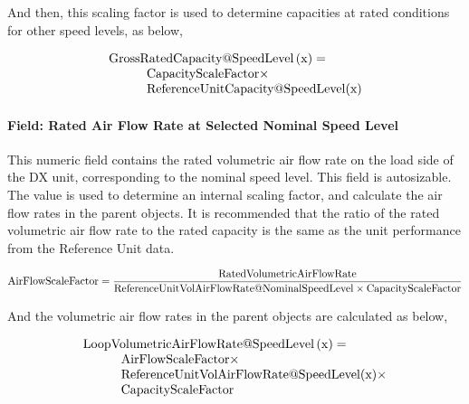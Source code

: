 And then, this scaling factor is used to determine capacities at rated conditions for other speed levels, as below,

\begin{equation}
  \begin{array}{l}
    \rm{Gross RatedCapacity} @ \rm{SpeedLevel} \left( {\rm{x}} \right) = \\
    \quad \quad \quad \rm{CapacityScaleFactor} \times \\
    \quad \quad \quad \rm{ReferenceUnitCapacity} @ {\rm{SpeedLevel}}(\rm{x})
  \end{array}
\end{equation}

\paragraph{Field: Rated Air Flow Rate at Selected Nominal Speed Level}\label{field-rated-air-flow-rate-at-selected-nominal-speed-level}

This numeric field contains the rated volumetric air flow rate on the load side of the DX unit, corresponding to the nominal speed level. This field is autosizable. The value is used to determine an internal scaling factor, and calculate the air flow rates in the parent objects. It is recommended that the ratio of the rated volumetric air flow rate to the rated capacity is the same as the unit performance from the Reference Unit data.

\begin{equation}
\rm{AirFlowScaleFactor} = \frac{\rm{RatedVolumetricAirFlowRate}}{\rm{ReferenceUnitVolAirFlowRate} @ \rm{NominalSpeedLevel} \times \rm{CapacityScaleFactor}}
\end{equation}

And the volumetric air flow rates in the parent objects are calculated as below,

\begin{equation}
  \begin{array}{l}
    \rm{LoopVolumetricAirFlowRate} @ \rm{SpeedLevel} \left( \rm{x} \right) = \\
    \quad \quad \quad \rm{AirFlowScaleFactor} \times \\
    \quad \quad \quad \rm{ReferenceUnitVolAirFlowRate} @ \rm{SpeedLevel}(\rm{x}) \times \\
    \quad \quad \quad \rm{CapacityScaleFactor}
  \end{array}
\end{equation}

